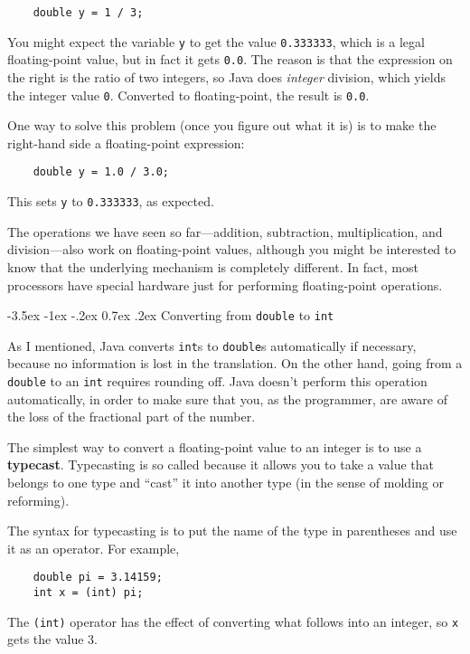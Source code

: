 \documentclass{book}
\makeatletter
\renewcommand{\section}{\@startsection 
    {section} {1} {0mm}%
    {-3.5ex \@plus -1ex \@minus -.2ex}%
    {0.7ex \@plus.2ex}%
    {\normalfont\Large\bfseries}}
\makeatother
\begin{document}
\begin{verbatim}
    double y = 1 / 3;
\end{verbatim}
%
You might expect the variable {\tt y} to get the value
{\tt 0.333333}, which is a legal floating-point value, but in
fact it gets {\tt 0.0}.  The reason is that the
expression on the right is the ratio of two integers,
so Java does {\em integer} division, which yields the integer
value {\tt 0}.  Converted to floating-point, the result is
{\tt 0.0}.

One way to solve this problem (once you figure out what
it is) is to make the right-hand side a floating-point
expression:

\begin{verbatim}
    double y = 1.0 / 3.0;
\end{verbatim}
%
This sets {\tt y} to {\tt 0.333333}, as expected.


The operations we have seen so far---addition, subtraction,
multiplication, and division---also work on floating-point values,
although you might be interested to know that the underlying mechanism
is completely different.  In fact, most processors have special
hardware just for performing floating-point operations.


\section{Converting from {\tt double} to {\tt int}}
\label{rounding}

As I mentioned, Java converts {\tt int}s
to {\tt double}s automatically if necessary, because no
information is lost in the translation.  On the other hand,
going from a {\tt double} to an {\tt int} requires rounding
off.  Java doesn't perform this operation automatically, in
order to make sure that you, as the programmer, are aware
of the loss of the fractional part of the number.

The simplest way to convert a floating-point value to an integer is to
use a {\bf typecast}.  Typecasting is so called because it allows you
to take a value that belongs to one type and ``cast'' it into another
type (in the sense of molding or reforming).

The syntax for typecasting is to put
the name of the type in parentheses and use it as an operator.
For example,

\begin{verbatim}
    double pi = 3.14159;
    int x = (int) pi;
\end{verbatim}
%
The {\tt(int)} operator has the effect of converting what
follows into an integer, so {\tt x} gets the value 3.
\end{document}
